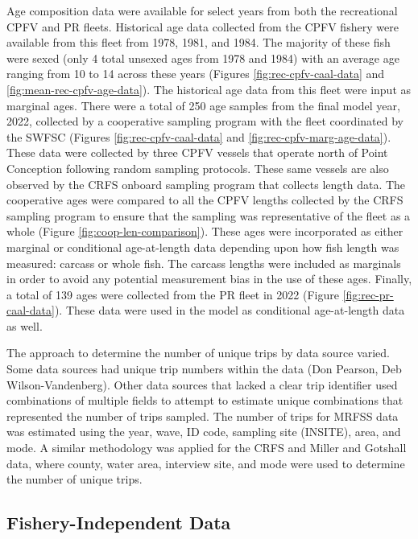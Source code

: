 \documentclass[11pt,
  letterpaper,
]{article}
\begin{document}
Age composition data were available for select years from both the recreational CPFV and PR fleets. Historical age data collected from the CPFV fishery were available from this fleet from 1978, 1981, and 1984. The majority of these fish were sexed (only 4 total unsexed ages from 1978 and 1984) with an average age ranging from 10 to 14 across these years (Figures \ref{fig:rec-cpfv-caal-data} and \ref{fig:mean-rec-cpfv-age-data}). The historical age data from this fleet were input as marginal ages. There were a total of 250 age samples from the final model year, 2022, collected by a cooperative sampling program with the fleet coordinated by the SWFSC (Figures \ref{fig:rec-cpfv-caal-data} and \ref{fig:rec-cpfv-marg-age-data}). These data were collected by three CPFV vessels that operate north of Point Conception following random sampling protocols. These same vessels are also observed by the CRFS onboard sampling program that collects length data. The cooperative ages were compared to all the CPFV lengths collected by the CRFS sampling program to ensure that the sampling was representative of the fleet as a whole (Figure \ref{fig:coop-len-comparison}). These ages were incorporated as either marginal or conditional age-at-length data depending upon how fish length was measured: carcass or whole fish. The carcass lengths were included as marginals in order to avoid any potential measurement bias in the use of these ages. Finally, a total of 139 ages were collected from the PR fleet in 2022 (Figure \ref{fig:rec-pr-caal-data}). These data were used in the model as conditional age-at-length data as well.

The approach to determine the number of unique trips by data source varied. Some data sources had unique trip numbers within the data (Don Pearson, Deb Wilson-Vandenberg). Other data sources that lacked a clear trip identifier used combinations of multiple fields to attempt to estimate unique combinations that represented the number of trips sampled. The number of trips for MRFSS data was estimated using the year, wave, ID code, sampling site (INSITE), area, and mode. A similar methodology was applied for the CRFS and Miller and Gotshall data, where county, water area, interview site, and mode were used to determine the number of unique trips.

\subsection{Fishery-Independent Data}\label{fishery-independent-data}
\end{document}
